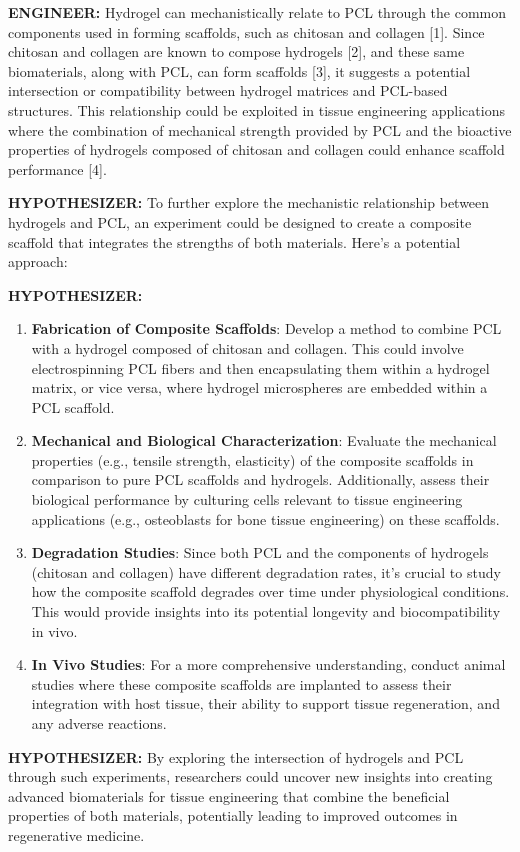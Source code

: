 \documentclass{article}
\begin{document}
\begin{rightbubbles}
\textbf{ENGINEER:} Hydrogel can mechanistically relate to PCL through the common components used in forming scaffolds, such as chitosan and collagen [1]. Since chitosan and collagen are known to compose hydrogels [2], and these same biomaterials, along with PCL, can form scaffolds [3], it suggests a potential intersection or compatibility between hydrogel matrices and PCL-based structures. This relationship could be exploited in tissue engineering applications where the combination of mechanical strength provided by PCL and the bioactive properties of hydrogels composed of chitosan and collagen could enhance scaffold performance [4]. 
\end{rightbubbles}

\begin{leftbubbles}
\textbf{HYPOTHESIZER: } To further explore the mechanistic relationship between hydrogels and PCL, an experiment could be designed to create a composite scaffold that integrates the strengths of both materials. Here's a potential approach:

\textbf{HYPOTHESIZER:}
\begin{enumerate}
    \item \textbf{Fabrication of Composite Scaffolds}: Develop a method to combine PCL with a hydrogel composed of chitosan and collagen. This could involve electrospinning PCL fibers and then encapsulating them within a hydrogel matrix, or vice versa, where hydrogel microspheres are embedded within a PCL scaffold.
    \item \textbf{Mechanical and Biological Characterization}: Evaluate the mechanical properties (e.g., tensile strength, elasticity) of the composite scaffolds in comparison to pure PCL scaffolds and hydrogels. Additionally, assess their biological performance by culturing cells relevant to tissue engineering applications (e.g., osteoblasts for bone tissue engineering) on these scaffolds.
    \item \textbf{Degradation Studies}: Since both PCL and the components of hydrogels (chitosan and collagen) have different degradation rates, it's crucial to study how the composite scaffold degrades over time under physiological conditions. This would provide insights into its potential longevity and biocompatibility in vivo.
    \item \textbf{In Vivo Studies}: For a more comprehensive understanding, conduct animal studies where these composite scaffolds are implanted to assess their integration with host tissue, their ability to support tissue regeneration, and any adverse reactions.
\end{enumerate}

\textbf{HYPOTHESIZER:} By exploring the intersection of hydrogels and PCL through such experiments, researchers could uncover new insights into creating advanced biomaterials for tissue engineering that combine the beneficial properties of both materials, potentially leading to improved outcomes in regenerative medicine.
\end{leftbubbles}
\end{document}

